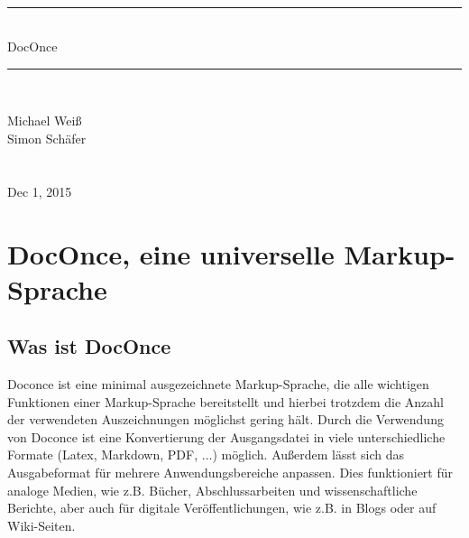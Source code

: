 \documentclass[%
oneside,                 %
final,                   %
chapterprefix=true,      %
open=right,              %
10pt]{book}
\begin{document}






\thispagestyle{empty}
\hbox{\ \ }
\vfill
\begin{center}
{\huge{\bfseries{
\begin{spacing}{1.25}
{\rule{\linewidth}{0.5mm}} \\[0.4cm]
{DocOnce}
\\[0.4cm] {\rule{\linewidth}{0.5mm}} \\[1.5cm]
\end{spacing}
}}}


\vspace{0.5cm}

{\Large\textsf{Michael Weiß${}^{}$}}\\ [3mm]

{\Large\textsf{Simon Schäfer${}^{}$}}\\ [3mm]

\ \\ [2mm]


\ \\ [10mm]
{\large\textsf{Dec 1, 2015}}

\end{center}
\vfill
\clearpage

\tableofcontents


\vspace{1cm} %




\chapter{DocOnce, eine universelle Markup-Sprache}
\section{Was ist DocOnce}
Doconce ist eine minimal ausgezeichnete Markup-Sprache, die alle wichtigen Funktionen einer Markup-Sprache bereitstellt und hierbei trotzdem die Anzahl der verwendeten Auszeichnungen möglichst gering hält. Durch die Verwendung von Doconce ist eine Konvertierung der Ausgangsdatei in viele unterschiedliche Formate (Latex, Markdown, PDF, ...) möglich. Außerdem lässt sich das Ausgabeformat für mehrere Anwendungsbereiche anpassen. Dies funktioniert für analoge Medien, wie z.B. Bücher, Abschlussarbeiten und wissenschaftliche Berichte, aber auch für digitale Veröffentlichungen, wie z.B. in Blogs oder auf Wiki-Seiten.
\end{document}
